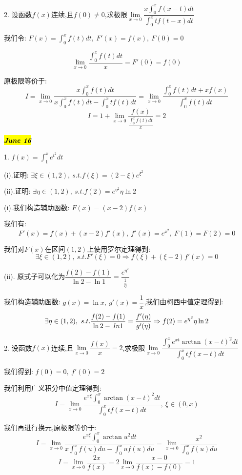 2. 设函数$f(x)$连续,且$f(0)\neq 0$,求极限$\lim\limits_{x\rightarrow 0}\dfrac{x\int_{0}^{x}f(x-t)dt}{\int_{0}^{x}tf(t-x)dt}$
\begin{solution}
	
	我们令: $F(x)=\int_{0}^{x}f(t)dt,\ F'(x)=f(x),\ F(0)=0$
	
	$$\lim\limits_{x\rightarrow 0}\dfrac{\int_{0}^{x}f(t)dt}{x}=F'(0)=f(0)$$
	
	原极限等价于: 
	$$I=\lim\limits_{x\rightarrow 0}\dfrac{x\int_{0}^{x}f(t)dt}{x\int_{0}^{x}f(t)dt-\int_{0}^{x}tf(t)dt}=\lim\limits_{x\rightarrow 0}\dfrac{\int_{0}^{x}f(t)dt+xf(x)}{\int_{0}^{x}f(t)dt}$$
	$$I=1+\lim\limits_{x\rightarrow 0}\dfrac{f(x)}{\frac{\int_{0}^{x}f(t)dt}{x}}=2$$
\end{solution}

\hl{\textbf{\textit{June 16}}}

1. $f(x)=\int_{1}^{x}e^{t^2}dt$

(i).证明: $\exists \xi\in(1,2),\ s.t. f(\xi)=(2-\xi)e^{\xi^2}$

(ii).证明: $\exists \eta \in(1,2),\ s.t. f(2)= e^{\eta^2}\eta \ln 2$
\begin{solution}
	
	(i).我们构造辅助函数: $F(x)=(x-2)f(x)$
	
	我们有: $$F'(x)=f(x)+(x-2)f'(x),\ f'(x)=e^{x^2},\ F(1)=F(2)=0$$
	
	我们对$F(x)$在区间$(1,2)$上使用罗尔定理得到: 
	$$\exists \xi\in(1,2),\ s.t. F'(\xi)=0\Rightarrow f(\xi)+(\xi-2)f'(x)=0$$
	
	(ii). 原式子可以化为$\dfrac{f(2)-f(1)}{\ln 2-\ln 1}=\dfrac{e^{\eta^2}}{\frac{1}{\eta}}$
	
	我们构造辅助函数: $g(x)=\ln x,\ g'(x)=\dfrac{1}{x}$,我们由柯西中值定理得到: 
	$$\exists \eta\in(1,2),\ s.t. \dfrac{f(2)-f(1)}{\ln 2-\\ln 1}=\dfrac{f'(\eta)}{g'(\eta)}\Rightarrow f(2)=e^{\eta^2}\eta \ln 2$$
\end{solution}

2. 设函数$f(x)$连续,且$\lim\limits_{x\rightarrow 0}\dfrac{f(x)}{x}=2$,求极限$\lim\limits_{x\rightarrow 0}\dfrac{\int_{0}^{x}e^{xt}\arctan(x-t)^2dt}{\int_{0}^{x}tf(x-t)dt}$
\begin{solution}
	
	我们得到: $f(0)=0,\ f'(0)=2$
	
	我们利用广义积分中值定理得到: 
	$$I=\lim\limits_{x\rightarrow 0}\dfrac{e^{x\xi}\int_{0}^{x}\arctan(x-t)^2dt}{\int_{0}^{x}tf(x-t)dt},\ \xi\in(0,x)$$
	
	我们再进行换元,原极限等价于: 
	$$I=\lim\limits_{x\rightarrow 0}\dfrac{e^{x\xi}\int_{0}^{x}\arctan u^2dt}{x\int_{0}^{x}f(u)du-\int_{0}^{x}uf(u)du}=\lim\limits_{x\rightarrow 0}\dfrac{x^2}{\int_{0}^{x}f(u)du}$$
	$$I=\lim\limits_{x\rightarrow 0}\dfrac{2x}{f(x)}=2\lim\limits_{x\rightarrow 0}\dfrac{x-0}{f(x)-f(0)}=1$$
\end{solution}

